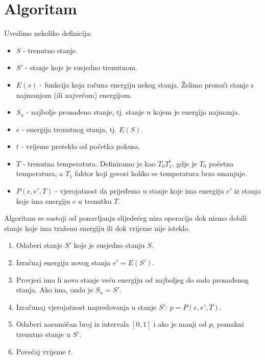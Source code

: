 \documentclass[times, utf8, zavrsni]{fer}
\begin{document}
\section{Algoritam}
Uvedimo nekoliko definicija:
\begin{itemize}
\item $S$ - trenutno stanje.

\item $S'$ - stanje koje je susjedno trenutnom.

\item $E(s)$ - funkcija koja računa energiju nekog stanja. Želimo pronaći
stanje s najmanjom (ili najvećom) energijom. 

\item $S_{n}$ - najbolje pronađeno stanje, tj. stanje u kojem je 
energija najmanja.

\item $e$ - energija trenutnog stanja, tj. $E(S)$.

\item $t$ - vrijeme proteklo od početka pokusa. 

\item $T$ - trenutna temperatura. Definiramo je kao $T_0 T_1^{t}$, gdje je
$T_0$ početna temperatura, a $T_1$ faktor koji govori koliko se temperatura
brzo smanjuje. 

\item $P(e, e', T)$ - vjerojatnost da prijeđemo u stanje koje ima energiju
$e'$ iz stanja koje ima energiju $e$ u trenutku $T$. 
\end{itemize}

Algoritam se sastoji od ponavljanja slijedećeg niza operacija
dok nismo dobili stanje koje ima traženu energiju ili dok vrijeme nije isteklo.

\begin{enumerate}
\item
Odaberi stanje $S'$ koje je susjedno stanju $S$. 

\item
Izračnaj energiju novog stanja $e' = E(S')$. 

\item 
Provjeri ima li novo stanje veću energiju od najboljeg do sada pronađenog stanja.
Ako ima, onda je $S_n = S'$.

\item
Izračunaj vjerojatnost napredovanja u stanje $S'$: $p = P(e, e', T)$. 

\item
Odaberi nasumičan broj iz intervala $[0, 1]$ i ako je manji od $p$, 
pomakni trenutno stanje u $S'$. 

\item 
Povećaj vrijeme $t$. 

\end{enumerate}
\end{document}

